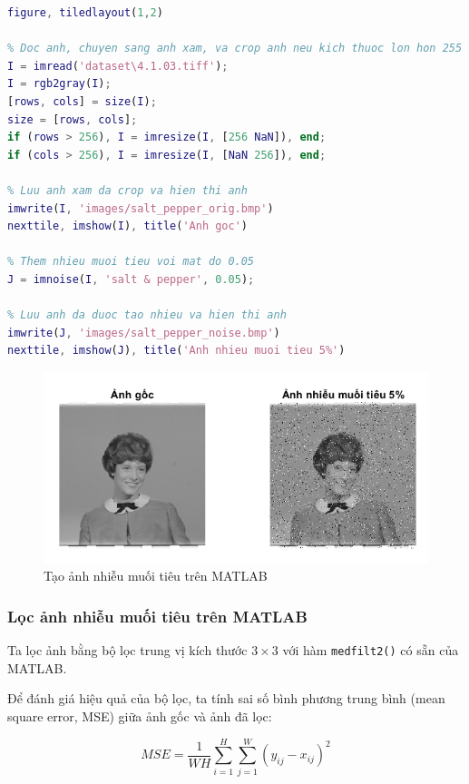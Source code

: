 \begin{lstlisting}[language=MATLAB]
figure, tiledlayout(1,2)

% Doc anh, chuyen sang anh xam, va crop anh neu kich thuoc lon hon 255
I = imread('dataset\4.1.03.tiff');
I = rgb2gray(I);
[rows, cols] = size(I);
size = [rows, cols];
if (rows > 256), I = imresize(I, [256 NaN]), end;
if (cols > 256), I = imresize(I, [NaN 256]), end;

% Luu anh xam da crop va hien thi anh
imwrite(I, 'images/salt_pepper_orig.bmp')
nexttile, imshow(I), title('Anh goc')

% Them nhieu muoi tieu voi mat do 0.05
J = imnoise(I, 'salt & pepper', 0.05);

% Luu anh da duoc tao nhieu va hien thi anh
imwrite(J, 'images/salt_pepper_noise.bmp')
nexttile, imshow(J), title('Anh nhieu muoi tieu 5%')
\end{lstlisting}

\begin{figure}[H]
    \centering
    \includegraphics[width=1\linewidth]{images/salt_pepper_noise_matlab.png}
    \caption{Tạo ảnh nhiễu muối tiêu trên MATLAB}
    \label{fig:salt_pepper_noise_matlab}
\end{figure}

\subsubsection{Lọc ảnh nhiễu muối tiêu trên MATLAB}

Ta lọc ảnh bằng bộ lọc trung vị kích thước $3 \times 3$ với hàm \texttt{medfilt2()} có sẵn của MATLAB. 

Để đánh giá hiệu quả của bộ lọc, ta tính sai số bình phương trung bình (mean square error, MSE) giữa ảnh gốc và ảnh đã lọc:

\begin{equation}\label{eqn:MSE}
    MSE = \frac{1}{WH} \sum_{i=1}^{H} \sum_{j=1}^{W} {(y_{ij} - x_{ij})^2}
\end{equation}

